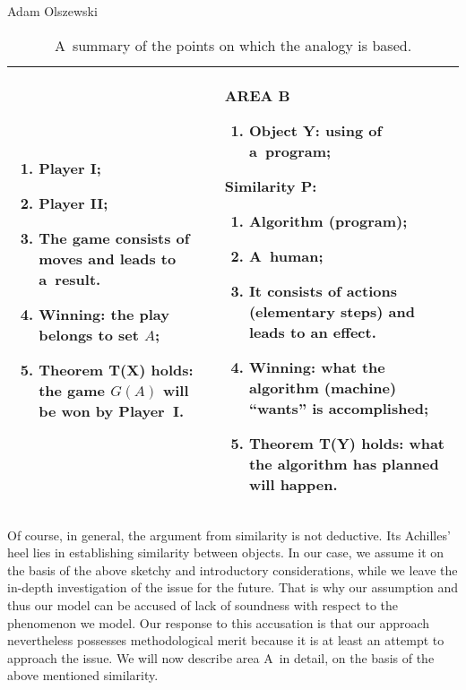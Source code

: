 \begin{artengenv}{Adam Olszewski}
\begin{table}[H]
\begin{small}
\begin{tabular}{|p{}|p{}|}
\begin{enumerate}[wide, labelwidth=!, labelindent=0pt, start=2]
\item Player \textbf{I};
\item Player \textbf{II};
\item The game consists of moves and leads to a~result.
\item Winning: the play belongs to set $A$;
\item Theorem T(X) holds: the game $G(A)$ will be won by Player~\textbf{I}.
\end{enumerate}
&
AREA B

\begin{enumerate}[wide, labelwidth=!, labelindent=0pt]
\item Object Y: using of a~program;
\end{enumerate}
Similarity P:

\begin{enumerate}[wide, labelwidth=!, labelindent=0pt,start=2]
\item Algorithm (program);
\item A~human;
\item It consists of actions (elementary steps) and leads to an effect.
\item Winning: what the algorithm (machine) ``wants'' is accomplished;
\item Theorem T(Y) holds: what the algorithm has planned will happen.
\end{enumerate}
\\\hline
\end{tabular}
\end{small}
\caption{A~summary of the points on which the analogy is based.}

\end{table}

Of course, in general, the argument from similarity is not deductive. Its Achilles' heel lies in establishing similarity between objects. In our case, we assume it on the basis of the above sketchy and introductory considerations, while we leave the in-depth investigation of the issue for the future. That is why our assumption and thus our model can be accused of lack of soundness with respect to the phenomenon we model. Our response to this accusation is that our approach nevertheless possesses methodological merit because it is at least an attempt to approach the issue. We will now describe area A~in detail, on the basis of the above mentioned similarity.


\end{artengenv}
